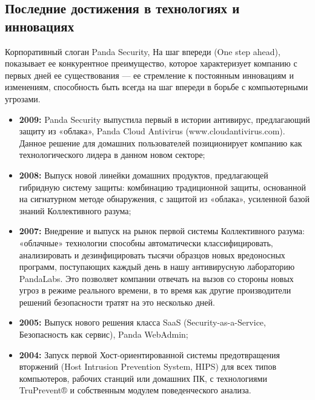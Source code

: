     \subsection{Последние достижения в технологиях и инновациях}
        Корпоративный слоган Panda Security, На шаг впереди (One step ahead), показывает ее конкурентное преимущество,
        которое характеризует компанию с первых дней ее существования — ее стремление к постоянным
        инновациям и изменениям, способность быть всегда на шаг впереди в борьбе с компьютерными угрозами.
        \begin{itemize}
            \item {\bf 2009:} Panda Security выпустила первый в истории антивирус, предлагающий защиту из
            «облака», Panda Cloud Antivirus (www.cloudantivirus.com). Данное решение для домашних пользователей
            позиционирует компанию как технологического лидера в данном новом секторе;
            \item {\bf 2008:} Выпуск новой линейки домашних продуктов, предлагающей гибридную систему защиты:
            комбинацию традиционной защиты, основанной на сигнатурном методе обнаружения, с защитой из «облака», 
            усиленной базой знаний Коллективного разума;
            \item {\bf 2007:} Внедрение и выпуск на рынок первой системы Коллективного разума: «облачные»
            технологии способны автоматически классифицировать, анализировать и дезинфицировать тысячи образцов
            новых вредоносных программ, поступающих каждый день в нашу антивирусную лабораторию PandaLabs. Это
            позволяет компании отвечать на вызов со стороны новых угроз в режиме реального времени, в то время
            как другие производители решений безопасности тратят на это несколько дней.
            \item {\bf 2005:} Выпуск нового решения класса SaaS (Security-as-a-Service, Безопасность как сервис),
            Panda WebAdmin;
            \item {\bf 2004:} Запуск первой Хост-ориентированной системы предотвращения вторжений (Host Intrusion
            Prevention System, HIPS) для всех типов компьютеров, рабочих станций или домашних ПК, с технологиями
            TruPrevent® и собственным модулем поведенческого анализа.
        \end{itemize}
    \pagebreak

